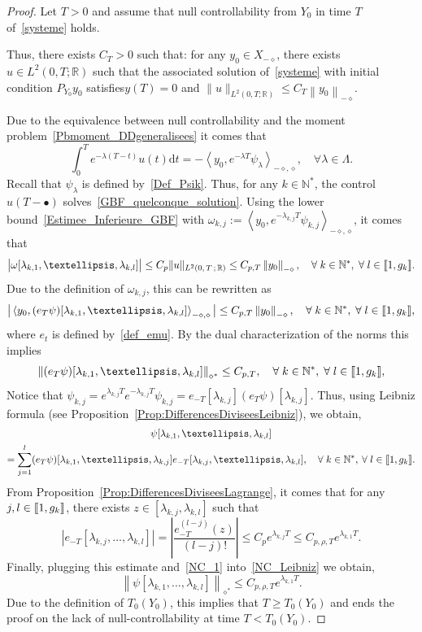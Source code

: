 \documentclass[11pt]{article}
\theoremstyle{definition}
\numberwithin{equation}{section}
\numberwithin{figure}{section}
\numberwithin{table}{section}
\newcommand{\llbracket}{\mathopen{[\mkern -2.7mu[}}
\newcommand{\rrbracket}{\mathclose{]\mkern -2.7mu]}}
\newcommand{\inter}[2]{\llbracket #1,#2 \rrbracket}
\newcommand{\Xmalpha}{X_{-\diamond}}
\newcommand{\Fzp}{Y_0}
\newcommand{\normeXalphas}[1]{\left\| #1 \right\|_{\diamond^*}}
\newcommand{\normeXmalpha}[1]{\left\| #1 \right\|_{-\diamond}}
\newcommand{\dual}[2]{\left\langle #1, #2 \right\rangle_{-\diamond,\diamond}}
\newcommand{\PF}{P_{\Fzp}}
\newcommand{\n}{g}
\newcommand{\N}{\mathbb{N}}
\newcommand{\R}{\mathbb{R}}
\newcommand{\md}{\mathrm{d}}
\renewcommand{\cdot}{{\scriptstyle \bullet}}
\let\oldforall\forall
\renewcommand*{\forall}{\mathrel{\oldforall}}
\begin{document}
\begin{proof}
Let $T>0$ and assume that null controllability from $\Fzp$ in time $T$ of~\eqref{systeme} holds.

Thus, there exists $C_T >0$ such that: for any $y_0 \in \Xmalpha$, there exists $u \in L^2(0,T ;\R)$ such that the associated solution of~\eqref{systeme} with initial condition $\PF y_0$ satisfies\linebreak$y(T)=0$ and $ \| u \|_{L^2(0,T ; \R)} \leq C_T \normeXmalpha{y_0}$.

Due to the equivalence between null controllability and the moment problem~\eqref{Pbmoment_DDgeneralisees} it comes that
\[
\int_0^T e^{-\lambda (T-t)} u(t) \md t = - \dual{y_0}{e^{-\lambda T} \psi_\lambda}, \quad \forall \lambda \in \Lambda.
\]
Recall that $\psi_\lambda$ is defined by~\eqref{Def_Psik}. Thus, for any $k \in \N^*$, the control $u(T-\cdot)$ solves~\eqref{GBF_quelconque_solution}. Using the lower bound~\eqref{Estimee_Inferieure_GBF} with $\omega_{k,j} := \dual{y_0}{e^{-\lambda_{k,j} T} \psi_{k,j}}$, it comes that
\[
\big| \omega[\lambda_{k,1}, \dots, \lambda_{k,l}] \big| \leq C_p \| u \|_{L^2(0,\,T\,;\,\R)} \leq C_{p,T} \normeXmalpha{y_0},
\quad \forall k \in \N^*, \; \forall l \in \inter{1}{\n_k}.
\]
Due to the definition of $\omega_{k,j}$, this can be rewritten as
\[
\big| \dual{y_0}{ (e_T \psi)[\lambda_{k,1}, \dots, \lambda_{k,l}]} \big| \leq C_{p,T} \normeXmalpha{y_0},
\quad \forall k \in \N^*, \; \forall l \in \inter{1}{\n_k},
\]
where $e_t$ is defined by~\eqref{def_emu}. By the dual characterization of the norms this implies
\begin{equation}\label{NC_1}
\normeXalphas{(e_T \psi)[\lambda_{k,1}, \dots, \lambda_{k,l}]} \leq C_{p,T},
\quad \forall k \in \N^*, \; \forall l \in \inter{1}{\n_k},
\end{equation}
Notice that $\psi_{k,j} = e^{\lambda_{k,j} T} e^{-\lambda_{k,j} T}\psi_{k,j} = e_{-T}[\lambda_{k,j}] (e_T \psi)[\lambda_{k,j}]$. Thus, using Leibniz formula (see Proposition~\ref{Prop:DifferencesDiviseesLeibniz}), we obtain,
\begin{multline}\label{NC_Leibniz}
\psi[\lambda_{k,1}, \dots, \lambda_{k,l}]\\
= \sum_{j=1}^l (e_T \psi)[\lambda_{k,1}, \dots, \lambda_{k,j}] e_{-T}[\lambda_{k,j}, \dots,\lambda_{k,l}],
\quad \forall k \in \N^*, \: \forall l \in \inter{1}{\n_k}.
\end{multline}
From Proposition~\ref{Prop:DifferencesDiviseesLagrange}, it comes that for any $j,l \in \inter{1}{\n_k}$, there exists $z \in [\lambda_{k,j}, \lambda_{k,l}]$ such that
\[
\left| e_{-T} [\lambda_{k,j}, \dots, \lambda_{k,l}] \right| = \left| \frac{e_{-T}^{(l-j)}(z)}{(l-j)!} \right| \leq C_p e^{\lambda_{k,j} T} \leq C_{p, \rho, T} e^{\lambda_{k,1} T}.
\]
Finally, plugging this estimate and~\eqref{NC_1} into~\eqref{NC_Leibniz} we obtain,
\[
\normeXalphas{\psi[\lambda_{k,1}, \dots, \lambda_{k,l}]} \leq C_{p, \rho, T} e^{\lambda_{k,1}T}.
\]
Due to the definition of $T_0(\Fzp)$, this implies that $T \geq T_0(\Fzp)$ and ends the proof on the lack of null-controllability at time $T<T_0(\Fzp)$.
\end{proof}
\end{document}
